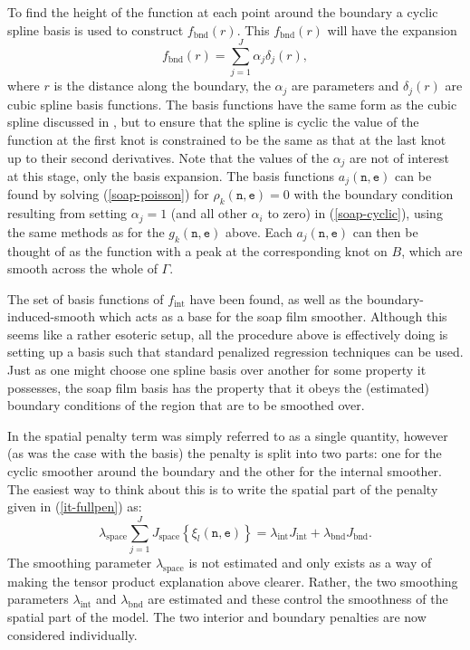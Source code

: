 To find the height of the function at each point around the boundary a cyclic spline basis is used to construct $f_\text{bnd}(r)$. This $f_\text{bnd}(r)$ will have the expansion
\begin{equation}
f_\text{bnd}(r)=\sum_{j=1}^J \alpha_j \delta_j(r),
\label{soap-cyclic}
\end{equation}
where $r$ is the distance along the boundary, the $\alpha_j$ are parameters and $\delta_j(r)$ are cubic spline basis functions. The basis functions have the same form as the cubic spline discussed in , but to ensure that the spline is cyclic the value of the function at the first knot is constrained to be the same as that at the last knot up to their second derivatives. Note that  the values of the $\alpha_j$ are not of interest at this stage, only the basis expansion. The basis functions $a_j(\texttt{n},\texttt{e})$ can be found by solving (\ref{soap-poisson}) for $\rho_k(\texttt{n},\texttt{e})= 0$ with the boundary condition resulting from setting $\alpha_j=1$ (and all other $\alpha_i$ to zero) in (\ref{soap-cyclic}), using the same methods as for the $g_k(\texttt{n},\texttt{e})$ above. Each $a_j(\texttt{n},\texttt{e})$ can then be thought of as the function with a peak at the corresponding knot on $B$, which are smooth across the whole of $\Gamma$.

The set of basis functions of $f_\text{int}$ have been found, as well as the boundary-induced-smooth which acts as a base for the soap film smoother. Although this seems like a rather esoteric setup, all the procedure above is effectively doing is setting up a basis such that standard penalized regression techniques can be used. Just as one might choose one spline basis over another for some property it possesses, the soap film basis has the property that it obeys the (estimated) boundary conditions of the region that are to be smoothed over.

In  the spatial penalty term was simply referred to as a single quantity, however (as was the case with the basis) the penalty is split into two parts: one for the cyclic smoother around the boundary and the other for the internal smoother. The easiest way to think about this is to write the spatial part of the penalty given in (\ref{it-fullpen}) as:
\begin{equation*}
\lambda_\text{space} \sum_{j=1}^J J_\text{space}\left\{  \xi_l(\texttt{n},\texttt{e}) \right\} = \lambda_\text{int} J_\text{int} + \lambda_\text{bnd} J_\text{bnd}.
\end{equation*}
The smoothing parameter $\lambda_\text{space}$ is not estimated and only exists as a way of making the tensor product explanation above clearer. \label{cor-r23}Rather, the two smoothing parameters $\lambda_\text{int}$ and $\lambda_\text{bnd}$ are estimated and these control the smoothness of the spatial part of the model. The two interior and boundary penalties are now considered individually.

